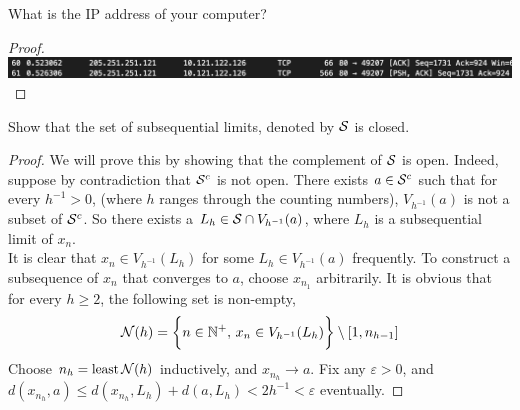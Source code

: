 \documentclass[../../main.tex]{subfiles}
\begin{document}
\begin{wts}
What is the IP address of your computer?
\end{wts}
\begin{proof}
\includegraphics{subfiles/images/ECSE_308_Lab_5_1_SUPA_PAGE4_15_Image48.png}


\end{proof}
\begin{wts}
    Show that the set of subsequential limits, denoted by $\mathcal{S}$ is closed.
\end{wts}
\begin{proof}
    We will prove this by showing that the complement of $\mathcal{S}$ is open. Indeed, suppose by contradiction that $\mathcal{S}^c$ is not open. There exists $a\in\mathcal{S}^c$ such that for every $h^{-1}>0$, (where $h$ ranges through the counting numbers), $V_{h^{-1}}(a)$ is not a subset of $\mathcal{S}^c$. So there exists a $L_h\in\mathcal{S}\cap V_{h^{-1}}(a)$, where $L_h$ is a subsequential limit of $x_n$.\\
    
    It is clear that $x_n\in V_{h^{-1}}(L_h)$ for some $L_h\in V_{h^{-1}}(a)$ frequently. To construct a subsequence of $x_n$ that converges to $a$, choose $x_{n_1}$ arbitrarily. It is obvious that for every $h\geq2$, the following set is non-empty,
    \[\mathcal{N}(h)=\biggl\{n\in\mathbb{N}^+,\,x_n\in V_{h^{-1}}(L_h)\biggr\}\setminus[1,n_{h-1}]\]
    Choose $n_h=\operatorname{least}\mathcal{N}(h)$ inductively, and $x_{n_h}\to a$. Fix any $\varepsilon>0$, and $d(x_{n_h},a)\leq d(x_{n_h},L_h) + d(a, L_h)<2h^{-1}<\varepsilon$
    eventually.
\end{proof}
\end{document}
